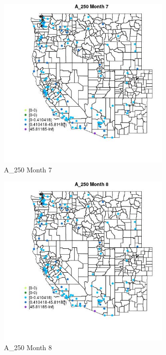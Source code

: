 \begin{figure} 
\centering  
\includegraphics[width=0.77\textwidth]{Code_Outputs/Report_ML_input_PM25_Step4_part_e_de_duplicated_aves_MapObsMo7A_250.jpg} 
\caption{\label{fig:Report_ML_input_PM25_Step4_part_e_de_duplicated_avesMapObsMo7A_250}A_250 Month 7} 
\end{figure} 
 

\begin{figure} 
\centering  
\includegraphics[width=0.77\textwidth]{Code_Outputs/Report_ML_input_PM25_Step4_part_e_de_duplicated_aves_MapObsMo8A_250.jpg} 
\caption{\label{fig:Report_ML_input_PM25_Step4_part_e_de_duplicated_avesMapObsMo8A_250}A_250 Month 8} 
\end{figure} 
 

